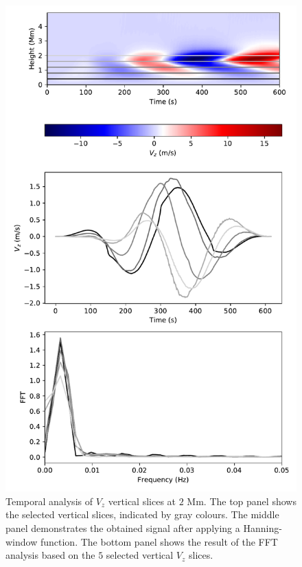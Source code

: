 \documentclass[linenumbers]{aastex63}
\begin{document}
\begin{figure}
    \centering
    \label{fft_sim2}
    \includegraphics[scale=0.55]{fft_sim2.pdf}
    \caption{Temporal analysis of $V_{z}$ vertical slices at $2$ Mm. The top panel shows the selected vertical slices, indicated by gray colours. The middle panel demonstrates the obtained signal after applying a Hanning-window function. The bottom panel shows the result of the FFT analysis based on the $5$ selected vertical $V_{z}$ slices.}

\end{figure}
\end{document}

